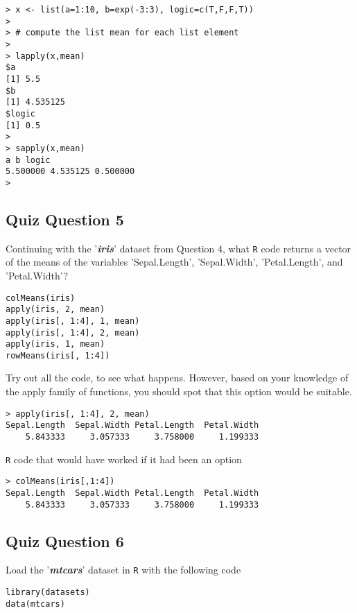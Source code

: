 \documentclass[12pt]{article}
\begin{document}
\begin{verbatim}
> x <- list(a=1:10, b=exp(-3:3), logic=c(T,F,F,T))
>
> # compute the list mean for each list element
>
> lapply(x,mean)
$a
[1] 5.5
$b
[1] 4.535125
$logic
[1] 0.5
>
> sapply(x,mean)
a b logic
5.500000 4.535125 0.500000
>
\end{verbatim}

\newpage
\subsection*{Quiz Question 5} %
Continuing with the '\textit{\textbf{iris}}' dataset from Question 4, what \texttt{R} code returns a vector of the means of the variables 'Sepal.Length', 'Sepal.Width', 'Petal.Length', and 'Petal.Width'?
\begin{framed}
\begin{verbatim}
colMeans(iris)
apply(iris, 2, mean)
apply(iris[, 1:4], 1, mean)
apply(iris[, 1:4], 2, mean)
apply(iris, 1, mean)
rowMeans(iris[, 1:4])
\end{verbatim}
\end{framed}
Try out all the code, to see what happens. However, based on your knowledge of the apply family of functions, you should spot that this option would be suitable.
\begin{verbatim}
> apply(iris[, 1:4], 2, mean)
Sepal.Length  Sepal.Width Petal.Length  Petal.Width 
    5.843333     3.057333     3.758000     1.199333 
\end{verbatim}

\noindent \texttt{R} code that would have worked if it had been an option

\begin{verbatim}
> colMeans(iris[,1:4])
Sepal.Length  Sepal.Width Petal.Length  Petal.Width 
    5.843333     3.057333     3.758000     1.199333
\end{verbatim}


\newpage
\subsection*{Quiz Question 6}
Load the '\textit{\textbf{mtcars}}' dataset in \texttt{R} with the following code

\begin{framed}
\begin{verbatim}
library(datasets)
data(mtcars)
\end{verbatim}
\end{framed}
\end{document}
